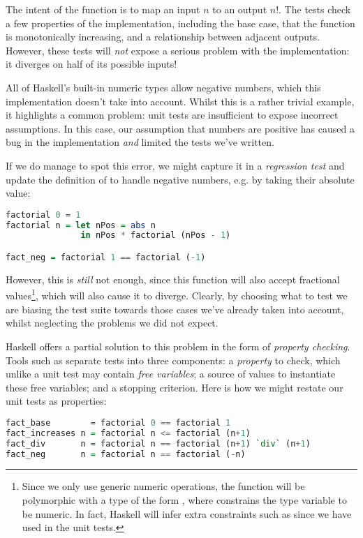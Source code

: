 The intent of the function is to map an input $n$ to an output $n!$. The tests check a few properties of the implementation, including the base case, that the function is monotonically increasing, and a relationship between adjacent outputs. However, these tests will \emph{not} expose a serious problem with the implementation: it diverges on half of its possible inputs!

All of Haskell's built-in numeric types allow negative numbers, which this implementation doesn't take into account. Whilst this is a rather trivial example, it highlights a common problem: unit tests are insufficient to expose incorrect assumptions. In this case, our assumption that numbers are positive has caused a bug in the implementation \emph{and} limited the tests we've written.

If we do manage to spot this error, we might capture it in a \emph{regression test} and update the definition of  to handle negative numbers, e.g. by taking their absolute value:

\begin{lstlisting}[language=Haskell, xleftmargin=.2\textwidth, xrightmargin=.2\textwidth]
factorial 0 = 1
factorial n = let nPos = abs n
               in nPos * factorial (nPos - 1)

fact_neg = factorial 1 == factorial (-1)
\end{lstlisting}

However, this is \emph{still} not enough, since this function will also accept fractional values\footnote{Since we only use generic numeric operations, the function will be polymorphic with a type of the form , where  constrains the type variable  to be numeric. In fact, Haskell will infer extra constraints such as  since we have used \hs{==} in the unit tests.}, which will also cause it to diverge. Clearly, by choosing what to test we are biasing the test suite towards those cases we've already taken into account, whilst neglecting the problems we did not expect.

Haskell offers a partial solution to this problem in the form of \emph{property checking}. Tools such as \qcheck{} separate tests into three components: a \emph{property} to check, which unlike a unit test may contain \emph{free variables}; a source of values to instantiate these free variables; and a stopping criterion. Here is how we might restate our unit tests as properties:

\begin{lstlisting}[language=Haskell, xleftmargin=.2\textwidth, xrightmargin=.2\textwidth]
fact_base        = factorial 0 == factorial 1
fact_increases n = factorial n <= factorial (n+1)
fact_div       n = factorial n == factorial (n+1) `div` (n+1)
fact_neg       n = factorial n == factorial (-n)
\end{lstlisting}

